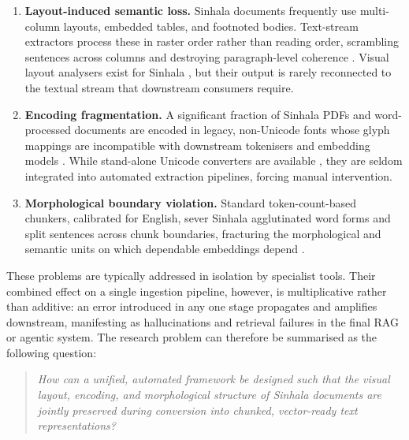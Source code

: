 \documentclass[12pt,a4paper,oneside]{report}
\begin{document}
\begin{enumerate}[label=\textbf{P\arabic*.}, leftmargin=3em]
    \item \textbf{Layout-induced semantic loss.} Sinhala documents frequently use multi-column layouts, embedded tables, and footnoted bodies. Text-stream extractors process these in raster order rather than reading order, scrambling sentences across columns and destroying paragraph-level coherence \cite{unstract2024pdfhell}. Visual layout analysers exist for Sinhala \cite{wickramasinghe2024unet}, but their output is rarely reconnected to the textual stream that downstream consumers require.

    \item \textbf{Encoding fragmentation.} A significant fraction of Sinhala PDFs and word-processed documents are encoded in legacy, non-Unicode fonts whose glyph mappings are incompatible with downstream tokenisers and embedding models \cite{herath2021sinhala}. While stand-alone Unicode converters are available \cite{webapps2025converter}, they are seldom integrated into automated extraction pipelines, forcing manual intervention.

    \item \textbf{Morphological boundary violation.} Standard token-count-based chunkers, calibrated for English, sever Sinhala agglutinated word forms and split sentences across chunk boundaries, fracturing the morphological and semantic units on which dependable embeddings depend \cite{pathirana2025sinmorphy, ruwanpathirana2015sentence}.
\end{enumerate}

These problems are typically addressed in isolation by specialist tools. Their combined effect on a single ingestion pipeline, however, is multiplicative rather than additive: an error introduced in any one stage propagates and amplifies downstream, manifesting as hallucinations and retrieval failures in the final RAG or agentic system. The research problem can therefore be summarised as the following question:

\begin{quote}
\textit{How can a unified, automated framework be designed such that the visual layout, encoding, and morphological structure of Sinhala documents are jointly preserved during conversion into chunked, vector-ready text representations?}
\end{quote}
\end{document}
